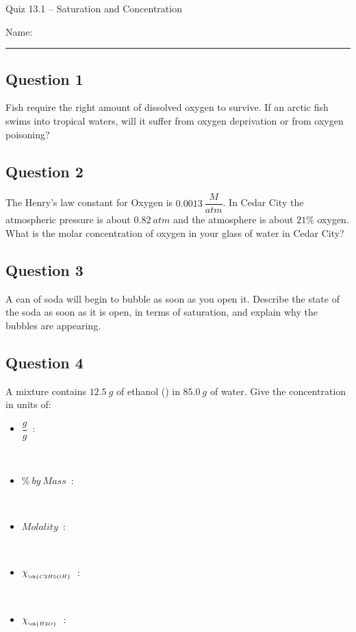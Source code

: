 \documentclass[11pt, letterpaper]{memoir}
\begin{document}
	\begin{center}
		{\large	Quiz 13.1 -- Saturation and Concentration}
	\end{center}
	{\large Name: \rule[-1mm]{4in}{.1pt} 
	
	\subsection*{Question 1}
	Fish require the right amount of dissolved oxygen to survive. If an arctic fish swims into tropical waters, will it suffer from oxygen deprivation or from oxygen poisoning?
	
	\vspace{2em}
	\subsection*{Question 2}
	The Henry's law constant for Oxygen is $0.0013~\dfrac{M}{atm}$. In Cedar City the atmospheric pressure is about $0.82~atm$ and the atmosphere is about $21\%$ oxygen. What is the molar concentration of oxygen in your glass of water in Cedar City?

	\vspace{2em}
	\subsection*{Question 3}
	A can of soda will begin to bubble as soon as you open it. Describe the state of the soda as soon as it is open, in terms of saturation, and explain why the bubbles are appearing.
	
	\vspace{4em}
	\subsection*{Question 4}
	A mixture contains $12.5~g$ of ethanol () in $85.0~g$ of water. Give the concentration in units of:
	\begin{itemize}
		\item $\dfrac{g}{g}$~:
		
		~
		\item $\%~by~Mass$~:
		
		~
		\item $Molality$~:
		
		~
		\item $\chi_{_{\ch{C2H5OH}}}$~:
		
		~
		\item $\chi_{_{\ch{H2O}}}$~:
	\end{itemize}

}
\end{document}
